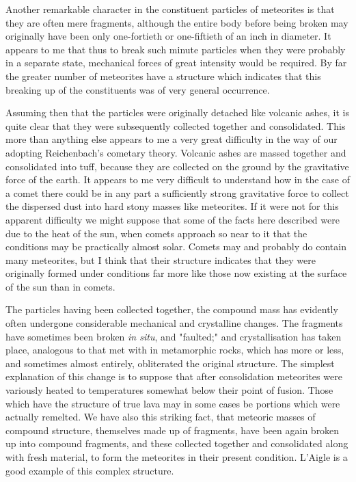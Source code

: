 \documentclass[a4paper, 12pt, oneside]{article}
\begin{document}
Another remarkable character in the constituent particles of meteorites is that they are often mere fragments, although the entire body before being broken may originally have been only one-fortieth or one-fiftieth of an inch in diameter. It appears to me that thus to break such minute particles when they were probably in a separate state, mechanical forces of great intensity would be required. By far the greater number of meteorites have a structure which indicates that this breaking up of the constituents was of very general occurrence.

Assuming then that the particles were originally detached like volcanic ashes, it is quite clear that they were subsequently collected together and consolidated. This more than anything else appears to me a very great difficulty in the way of our adopting Reichenbach's cometary theory. Volcanic ashes are massed together and consolidated into tuff, because they are collected on the ground by the gravitative force of the earth. It appears to me very difficult to understand how in the case of a comet there could be in any part a sufficiently strong gravitative force to collect the dispersed dust into hard stony masses like meteorites. If it were not for this apparent difficulty we might suppose that some of the facts here described were due to the heat of the sun, when comets approach so near to it that the conditions may be practically almost solar. Comets may and probably do contain many meteorites, but I think that their structure indicates that they were originally formed under conditions far more like those now existing at the surface of the sun than in comets.

The particles having been collected together, the compound mass has evidently often undergone considerable mechanical and crystalline changes. The fragments have sometimes been broken \emph{in situ}, and "faulted;" and crystallisation has taken place, analogous to that met with in metamorphic rocks, which has more or less, and sometimes almost entirely, obliterated the original structure. The simplest explanation of this change is to suppose that after consolidation meteorites were variously heated to temperatures somewhat below their point of fusion. Those which have the structure of true lava may in some cases be portions which were actually remelted. We have also this striking fact, that meteoric masses of compound structure, themselves made up of fragments, have been again broken up into compound fragments, and these collected together and consolidated along with fresh material, to form the meteorites in their present condition. L'Aigle is a good example of this complex structure.
\end{document}
